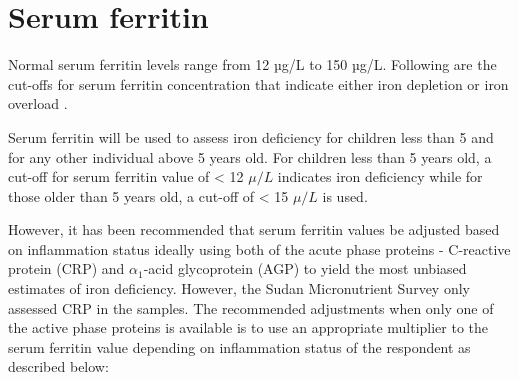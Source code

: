 \documentclass[12pt,a4paper]{article}
\begin{document}
\hypertarget{serum-ferritin}{%
\section{Serum ferritin}\label{serum-ferritin}}

Normal serum ferritin levels range from 12 µg/L to 150 µg/L. Following are the cut-offs for serum ferritin concentration that indicate either iron depletion or iron overload \citep{WorldHealthOrganization:2007tx, Gorstein:2007wn, Wegmuller:2020bw, WorldHealthOrganization:2011ue}.

\begin{table}[H]

\caption{\label{tab:ferritin}Relative extent of iron stores on the basis of serum ferritin concentration (µg/L)}
\centering
{}
\end{table}

Serum ferritin will be used to assess iron deficiency for children less than 5 and for any other individual above 5 years old. For children less than 5 years old, a cut-off for serum ferritin value of \textless{} 12 \(\mu/L\) indicates iron deficiency while for those older than 5 years old, a cut-off of \textless{} 15 \(\mu/L\) is used.

However, it has been recommended that serum ferritin values be adjusted based on inflammation status ideally using both of the acute phase proteins - C-reactive protein (CRP) and \(\alpha_1\)-acid glycoprotein (AGP) to yield the most unbiased estimates of iron deficiency. However, the Sudan Micronutrient Survey only assessed CRP in the samples. The recommended adjustments when only one of the active phase proteins is available is to use an appropriate multiplier to the serum ferritin value depending on inflammation status of the respondent as described below:
\end{document}
